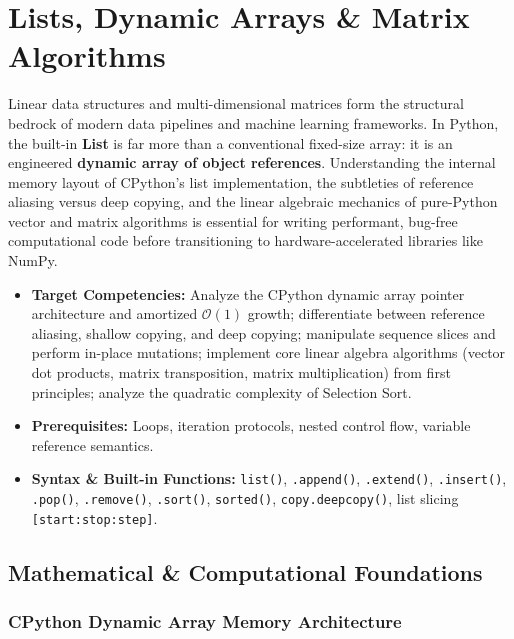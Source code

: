 \chapter{Lists, Dynamic Arrays \& Matrix Algorithms}

Linear data structures and multi-dimensional matrices form the structural bedrock of modern data pipelines and machine learning frameworks. In Python, the built-in \textbf{List} is far more than a conventional fixed-size array: it is an engineered \textbf{dynamic array of object references}. Understanding the internal memory layout of CPython's list implementation, the subtleties of reference aliasing versus deep copying, and the linear algebraic mechanics of pure-Python vector and matrix algorithms is essential for writing performant, bug-free computational code before transitioning to hardware-accelerated libraries like NumPy.

\vspace{0.5cm}
\begin{tcolorbox}[colback=primarylight, colframe=primarydark, title={\textbf{Executive Roadmap \& Learning Objectives}}]
\begin{itemize}
    \item \textbf{Target Competencies:} Analyze the CPython dynamic array pointer architecture and amortized $\mathcal{O}(1)$ growth; differentiate between reference aliasing, shallow copying, and deep copying; manipulate sequence slices and perform in-place mutations; implement core linear algebra algorithms (vector dot products, matrix transposition, matrix multiplication) from first principles; analyze the quadratic complexity of Selection Sort.
    \item \textbf{Prerequisites:} Loops, iteration protocols, nested control flow, variable reference semantics.
    \item \textbf{Syntax \& Built-in Functions:} \texttt{list()}, \texttt{.append()}, \texttt{.extend()}, \texttt{.insert()}, \texttt{.pop()}, \texttt{.remove()}, \texttt{.sort()}, \texttt{sorted()}, \texttt{copy.deepcopy()}, list slicing \texttt{[start:stop:step]}.
\end{itemize}
\end{tcolorbox}

\section{Mathematical \& Computational Foundations}

\subsection{CPython Dynamic Array Memory Architecture}

